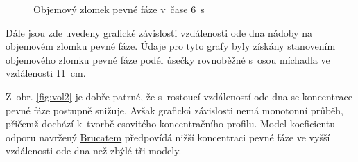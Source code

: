\begin{figure}[h!]
  \qquad
  \caption{Objemový zlomek pevné fáze v~čase \SI{6}{\second}}
  \label{fig:count6}
\end{figure}

\vspace{-9mm}
\newpage

Dále jsou zde uvedeny grafické závislosti vzdálenosti ode dna nádoby na objemovém zlomku pevné fáze. Údaje pro tyto grafy byly získány stanovením objemového zlomku pevné fáze podél úsečky rovnoběžné s~osou míchadla ve vzdálenosti \SI{11}{\centi\metre}.

Z~obr. \ref{fig:vol2} je dobře patrné, že s~rostoucí vzdáleností ode dna se koncentrace pevné fáze postupně snižuje. Avšak grafická závislosti nemá monotonní průběh, přičemž dochází k~tvorbě esovitého koncentračního profilu. Model koeficientu odporu navržený \hyperlink{hyp:cds}{Brucatem} předpovídá nižší koncentraci pevné fáze ve vyšší vzdálenosti ode dna než zbýlé tři modely.     


